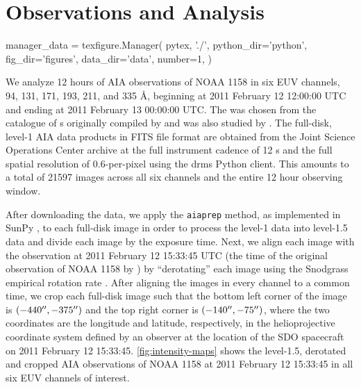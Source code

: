 \section{Observations and Analysis}\label{sec:observations}
\begin{pycode}
manager_data = texfigure.Manager(
    pytex, './',
    python_dir='python',
    fig_dir='figures',
    data_dir='data',
    number=1,
)
\end{pycode}

We analyze 12 hours of AIA observations of \AR{} NOAA 1158 in six EUV channels, 94, 131, 171, 193, 211, and 335 \AA{}, beginning at 2011 February 12 12:00:00 UTC and ending at 2011 February 13 00:00:00 UTC. The \AR{} was chosen from the catalogue of \AR s originally compiled by \citet{warren_systematic_2012} and was also studied by \citet{viall_survey_2017}. The full-disk, level-1 AIA data products in FITS file format are obtained from the Joint Science Operations Center \citep[JSOC,][]{couvidat_observables_2016} archive at the full instrument cadence of 12 s and the full spatial resolution of 0.6\arcsec-per-pixel using the drms Python client. This amounts to a total of 21597 images across all six channels and the entire 12 hour observing window.

After downloading the data, we apply the \texttt{aiaprep} method, as implemented in SunPy \citep{sunpy_community_sunpypython_2015}, to each full-disk image in order to process the level-1 data into level-1.5 data and divide each image by the exposure time. Next, we align each image with the observation at 2011 February 12 15:33:45 UTC (the time of the original observation of NOAA 1158 by \citet{warren_systematic_2012}) by ``derotating'' each image using the Snodgrass empirical rotation rate \citep{snodgrass_magnetic_1983}. After aligning the images in every channel to a common time, we crop each full-disk image such that the bottom left corner of the image is $(-440\mbox{$^{\prime\prime}$},-375\mbox{$^{\prime\prime}$})$ and the top right corner is $(-140\mbox{$^{\prime\prime}$},-75\mbox{$^{\prime\prime}$})$, where the two coordinates are the longitude and latitude, respectively, in the helioprojective coordinate system \citep[see][]{thompson_coordinate_2006} defined by an observer at the location of the SDO spacecraft on 2011 February 12 15:33:45. \autoref{fig:intensity-maps} shows the level-1.5, derotated and cropped AIA observations of \AR{} NOAA 1158 at 2011 February 12 15:33:45 in all six EUV channels of interest.

